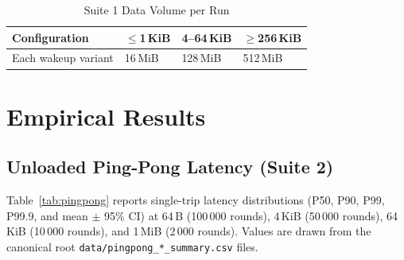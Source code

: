 \documentclass[10pt,conference]{IEEEtran}
\begin{document}
\begin{table}[!t]
  \centering
  \caption{Suite 1 Data Volume per Run}
  \label{tab:volumes}
  \small
  \begin{tabular}{@{}L{2.4cm}L{1.7cm}L{1.7cm}L{1.7cm}@{}}
    \toprule
    \textbf{Configuration} & \textbf{$\leq$1\,KiB} & \textbf{4--64\,KiB} & \textbf{$\geq$256\,KiB} \\
    \midrule
    Each wakeup variant & 16\,MiB & 128\,MiB & 512\,MiB \\
    \bottomrule
  \end{tabular}
\end{table}

\section{Empirical Results}

\subsection{Unloaded Ping-Pong Latency (Suite 2)}

Table~\ref{tab:pingpong} reports single-trip latency distributions (P50, P90, P99, P99.9, and mean $\pm$ 95\% CI) at 64\,B (100\,000 rounds), 4\,KiB (50\,000 rounds), 64\,KiB (10\,000 rounds), and 1\,MiB (2\,000 rounds). Values are drawn from the canonical root \texttt{data/pingpong\_*\_summary.csv} files.
\end{document}
